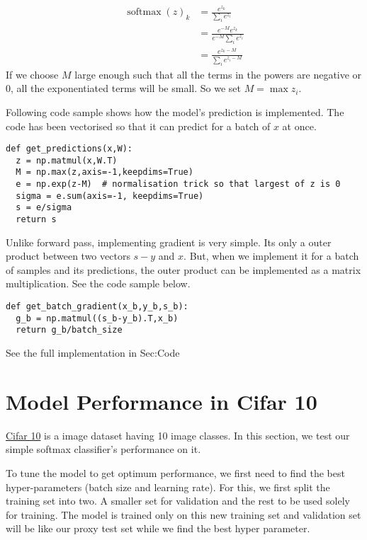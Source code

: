 \documentclass[10pt]{article}
\begin{document}
$$ \begin{aligned}
\operatorname{softmax}(z)_k &= \frac{e^{z_k}}{\sum_i e^{z_i}}
\\
&= \frac{e^{-M}e^{z_k}}{e^{-M}\sum_i e^{z_i}}
\\
&= \frac{e^{z_k-M}}{\sum_i e^{z_i-M}}
\end{aligned} $$
If we choose $M$ large enough such that all the terms in the powers are negative or $0$, all the 
exponentiated terms will be small. So we set $M = \max z_i$.

Following code sample shows how the model's prediction is implemented. The code has been vectorised so that it can predict for a batch of $x$ at once. 

\begin{verbatim}
def get_predictions(x,W):
  z = np.matmul(x,W.T)
  M = np.max(z,axis=-1,keepdims=True)
  e = np.exp(z-M)  # normalisation trick so that largest of z is 0
  sigma = e.sum(axis=-1, keepdims=True)
  s = e/sigma
  return s

\end{verbatim}

Unlike forward pass, implementing gradient is very simple. Its only a outer product between two vectors $s-y$ and $x$. But, when we implement it for a batch of samples and its predictions, the outer product can be implemented as a matrix multiplication. See the code sample below. 
\begin{verbatim}
def get_batch_gradient(x_b,y_b,s_b):
  g_b = np.matmul((s_b-y_b).T,x_b)
  return g_b/batch_size
\end{verbatim}
%
%

See the full implementation in Sec:Code

\section{Model Performance in Cifar 10}
\href{https://www.cs.toronto.edu/~kriz/cifar.html}{Cifar 10} is a image dataset having 10 image classes. In this section, we test our simple softmax classifier's performance on it. 

To tune the model to get optimum performance, we first need to find the best hyper-parameters (batch size and learning rate). For this, we first split the training set into two. A smaller set for validation and the rest to be used solely for training. The model is trained only on this new training set and validation set will be like our proxy test set while we find the best hyper parameter. 
\end{document}
